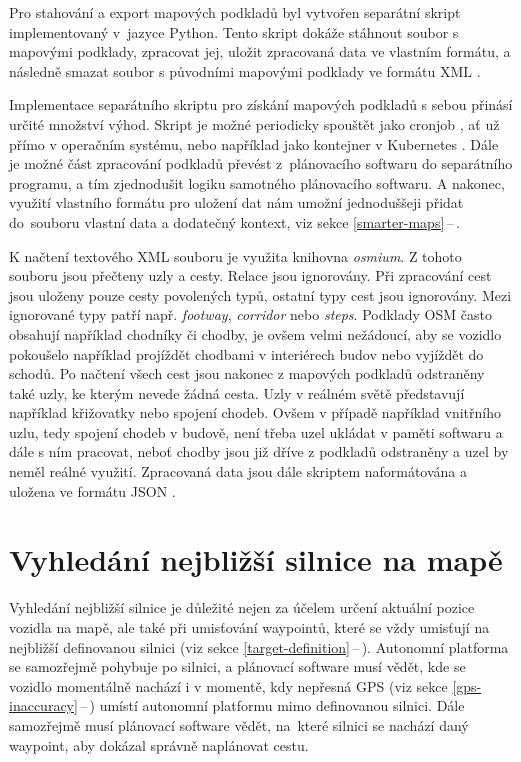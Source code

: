\documentclass[czech, bachelor]{diploma}
\newcommand{\peteref}[1]{\ref{#1}\,--\,\nameref{#1}}
\begin{document}
Pro stahování a export mapových podkladů byl vytvořen separátní skript implementovaný v~jazyce Python. Tento skript dokáže
stáhnout soubor s mapovými podklady, zpracovat jej, uložit zpracovaná data ve vlastním formátu, a následně smazat soubor
s původními mapovými podklady ve formátu XML \cite{xml-source}.

Implementace separátního skriptu pro získání mapových podkladů s sebou přinásí určité množství výhod. Skript je možné periodicky
spouštět jako cronjob \cite{cron-source}, ať už přímo v operačním systému, nebo například jako kontejner v Kubernetes
\cite{virtualization-source}. Dále je možné část zpracování podkladů převést z~plánovacího softwaru do separátního programu, a tím
zjednodušit logiku samotného plánovacího softwaru. A nakonec, využití vlastního formátu pro uložení dat nám umožní jednoduššeji
přidat do~souboru vlastní data a dodatečný kontext, viz sekce \peteref{smarter-maps}.

K načtení textového XML souboru je využita knihovna \emph{osmium}. Z tohoto souboru jsou přečteny uzly a cesty. Relace jsou
ignorovány. Při zpracování cest jsou uloženy pouze cesty povolených typů, ostatní typy cest jsou ignorovány. Mezi ignorované typy
patří např. \emph{footway}, \emph{corridor} nebo \emph{steps}. Podklady OSM často obsahují například chodníky či chodby, je ovšem
velmi nežádoucí, aby se vozidlo pokoušelo například projíždět chodbami v interiérech budov nebo vyjíždět do schodů. Po načtení
všech cest jsou nakonec z mapových podkladů odstraněny také uzly, ke kterým nevede žádná cesta. Uzly v reálném světě představují
například křižovatky nebo spojení chodeb. Ovšem v případě například vnitřního uzlu, tedy spojení chodeb v budově, není třeba uzel
ukládat v paměti softwaru a dále s ním pracovat, neboť chodby jsou již dříve z podkladů odstraněny a uzel by neměl reálné využití.
Zpracovaná data jsou dále skriptem naformátována a uložena ve formátu JSON \cite{json-source}.

\section{Vyhledání nejbližší silnice na mapě}

Vyhledání nejbližší silnice je důležité nejen za účelem určení aktuální pozice vozidla na mapě, ale také při umisťování waypointů,
které se vždy umisťují na nejbližší definovanou silnici (viz sekce \peteref{target-definition}). Autonomní platforma
se samozřejmě pohybuje po silnici, a plánovací software musí vědět, kde se vozidlo momentálně nachází i v momentě, kdy nepřesná
GPS (viz sekce \peteref{gps-inaccuracy}) umístí autonomní platformu mimo definovanou silnici. Dále samozřejmě musí plánovací
software vědět, na~které silnici se nachází daný waypoint, aby dokázal správně naplánovat cestu.
\end{document}
